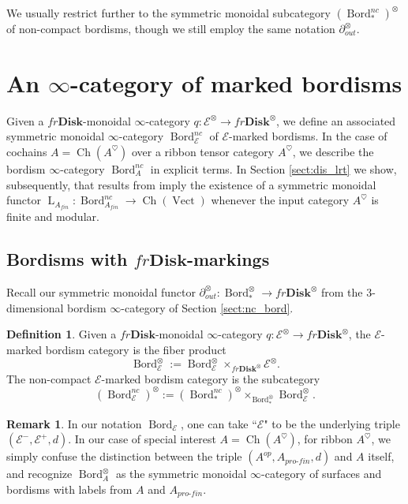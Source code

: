 \documentclass[reqno]{amsart}
\theoremstyle{definition}
\newtheorem{definition}[lemma]{Definition}
\newtheorem{remark}[lemma]{Remark}
\newcommand{\msc}[1]{\mathscr{#1}}
\newcommand{\opn}[1]{\operatorname{#1}}
\newcommand{\ot}{\otimes}
\newcommand{\Disk}{\mathbf{Disk}}
\newcommand{\pf}{pro\text{-}fin}
\DeclareMathOperator{\Bord}{Bord}
\renewcommand{\1}{\mathbf{1}}
\begin{document}
We usually restrict further to the symmetric monoidal subcategory $(\Bord^{nc}_{\ast})^{\ot}$ of non-compact bordisms, though we still employ the same notation $\partial^{\ot}_{out}$.

\section{An $\infty$-category of marked bordisms}
\label{sect:marked_bords}

Given a $fr\Disk$-monoidal $\infty$-category $q:\msc{E}^{\ot}\to fr\Disk^{\ot}$, we define an associated symmetric monoidal $\infty$-category $\Bord_{\msc{E}}^{nc}$ of $\msc{E}$-marked bordisms.  In the case of cochains $A=\opn{Ch}(A^{\heartsuit})$ over a ribbon tensor category $A^{\heartsuit}$, we describe the bordism $\infty$-category $\Bord_A^{nc}$ in explicit terms. In Section \ref{sect:dis_lrt} we show, subsequently, that results from \cite{derenzietal23,czenkynegron} imply the existence of a symmetric monoidal functor $\opn{L}_{A_{fin}}:\Bord^{nc}_{A_{fin}}\to \opn{Ch}(\opn{Vect})$ whenever the input category $A^{\heartsuit}$ is finite and modular. 

\subsection{Bordisms with $fr\Disk$-markings}

Recall our symmetric monoidal functor $\partial_{out}^{\ot}:\Bord_{\ast}^{\ot}\to fr\Disk^{\ot}$ from the $3$-dimensional bordism $\infty$-category of Section \ref{sect:nc_bord}.

\begin{definition}
Given a $fr\Disk$-monoidal $\infty$-category $q:\msc{E}^{\ot}\to fr\Disk^{\ot}$, the $\msc{E}$-marked bordism category is the fiber product
\[
\Bord_{\msc{E}}^{\ot}:=\Bord_{\msc{E}}^{\ot}\times_{fr\Disk^{\ot}}\msc{E}^{\ot}.
\]
The non-compact $\msc{E}$-marked bordism category is the subcategory
\[
(\Bord_{\msc{E}}^{nc})^{\ot}:=(\Bord^{nc}_{\ast})^{\ot}\times_{\Bord_{\ast}^{\ot}}\Bord_{\msc{E}}^{\ot}.
\]
\end{definition}

\begin{remark}
In our notation $\Bord_{\msc{E}}$, one can take ``$\msc{E}$" to be the underlying triple $(\msc{E}^-,\msc{E}^+,d)$. In our case of special interest $A=\opn{Ch}(A^{\heartsuit})$, for ribbon $A^{\heartsuit}$, we simply confuse the distinction between the triple $(A^{op},A_{\pf},d)$ and $A$ itself, and recognize $\Bord_A^{\ot}$ as the symmetric monoidal $\infty$-category of surfaces and bordisms with labels from $A$ and $A_{\pf}$.
\end{remark}
\end{document}
